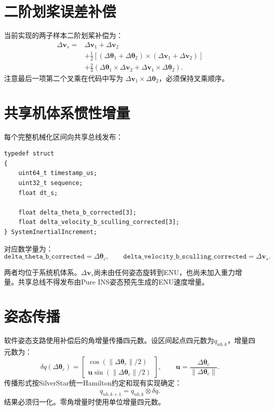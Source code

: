 \documentclass[12pt,a4paper]{ctexart}
\newcommand{\vect}[1]{\bm{#1}}
\newcommand{\cross}{\times}
\begin{document}
\section{二阶划桨误差补偿}
当前实现的两子样本二阶划桨补偿为：
\[
\boxed{
\begin{aligned}
\Delta\vect{v}_{s}
={}&
\Delta\vect{v}_1+\Delta\vect{v}_2\\
&+\frac{1}{2}
\left[
(\Delta\vect{\theta}_1+\Delta\vect{\theta}_2)
\cross
(\Delta\vect{v}_1+\Delta\vect{v}_2)
\right]\\
&+\frac{2}{3}
\left(
\Delta\vect{\theta}_1\cross\Delta\vect{v}_2
+
\Delta\vect{v}_1\cross\Delta\vect{\theta}_2
\right).
\end{aligned}
}
\]
注意最后一项第二个叉乘在代码中写为
$\Delta\vect{v}_1\cross\Delta\vect{\theta}_2$，必须保持叉乘顺序。

\section{共享机体系惯性增量}
每个完整机械化区间向共享总线发布：
\begin{verbatim}
typedef struct
{
    uint64_t timestamp_us;
    uint32_t sequence;
    float dt_s;

    float delta_theta_b_corrected[3];
    float delta_velocity_b_sculling_corrected[3];
} SystemInertialIncrement;
\end{verbatim}

对应数学量为：
\[
\texttt{delta\_theta\_b\_corrected}
=\Delta\vect{\theta}_{c},
\qquad
\texttt{delta\_velocity\_b\_sculling\_corrected}
=\Delta\vect{v}_{s}.
\]

两者均位于系统机体系。$\Delta\vect{v}_{s}$尚未由任何姿态旋转到ENU，也尚未加入重力增量。共享总线不得发布由Pure INS姿态预先生成的ENU速度增量。

\section{姿态传播}
软件姿态支路使用补偿后的角增量传播四元数。设区间起点四元数为$q_{nb,k}$，增量四元数为：
\[
\delta q(\Delta\vect{\theta}_{c})
=
\begin{bmatrix}
\cos(\|\Delta\vect{\theta}_{c}\|/2)\\
\vect{u}\sin(\|\Delta\vect{\theta}_{c}\|/2)
\end{bmatrix},
\qquad
\vect{u}=\frac{\Delta\vect{\theta}_{c}}{\|\Delta\vect{\theta}_{c}\|}.
\]
传播形式按SilverStar统一Hamilton约定和现有实现确定：
\[
q_{nb,k+1}=q_{nb,k}\otimes\delta q.
\]
结果必须归一化。零角增量时使用单位增量四元数。
\end{document}
